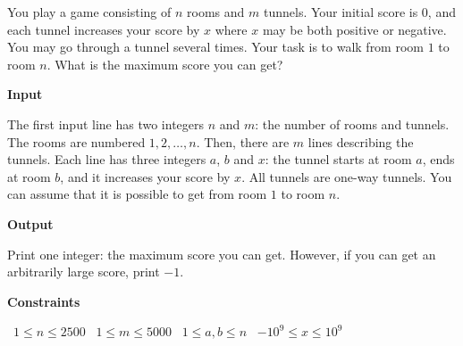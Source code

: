 You play a game consisting of $n$ rooms and $m$ tunnels. Your initial score is $0$, and each tunnel increases your score by $x$ where $x$ may be both positive or negative. You may go through a tunnel several times.
Your task is to walk from room $1$ to room $n$. What is the maximum score you can get?

\vspace{0.3cm}\noindent\textbf{Input}

The first input line has two integers $n$ and $m$: the number of rooms and tunnels. The rooms are numbered $1,2,\dots,n$.
Then, there are $m$ lines describing the tunnels. Each line has three integers $a$, $b$ and $x$: the tunnel starts at room $a$, ends at room $b$, and it increases your score by $x$. All tunnels are one-way tunnels.
You can assume that it is possible to get from room $1$ to room $n$.

\vspace{0.3cm}\noindent\textbf{Output}

Print one integer: the maximum score you can get. However, if you can get an arbitrarily large score, print $-1$.

\vspace{0.3cm}\noindent\textbf{Constraints}

\textbullet\ $1 \le n \le 2500$
\textbullet\ $1 \le m \le 5000$
\textbullet\ $1 \le a,b \le n$
\textbullet\ $-10^9 \le x \le 10^9$